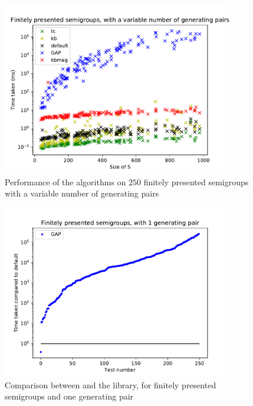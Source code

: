 \begin{figure}[p]
  \centering
  \includegraphics[width=0.9\textwidth]{pics/ch-pairs/bench-fp-vp-times}
  \caption[Benchmark: all algorithms, finitely presented, $n$ pairs]
  {Performance of the algorithms on $250$ finitely presented semigroups
    with a variable number of generating pairs}
  \label{fig:bench-fp-vp-times}
\end{figure}

\begin{figure}[p]
  \centering
  \includegraphics[width=0.9\textwidth]{pics/ch-pairs/bench-fp-1p-gap}
  \caption[Benchmark: \GAP{}/\libsemigroups{}, finitely presented, 1 pair]
  {Comparison between \libsemigroups{} and the \GAP{} library, for
    finitely presented semigroups and one generating pair}
  \label{fig:bench-fp-1p-gap}
\end{figure}

